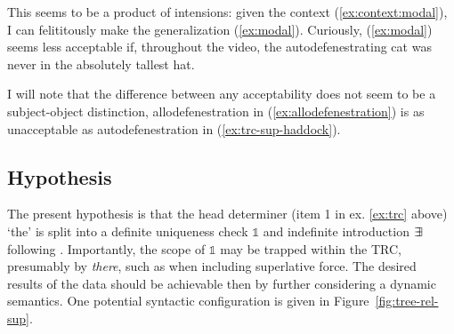 \documentclass[11pt]{article}
\DeclareMathOperator{\bbexists}{\exists\mskip-7mu\exists}
\begin{document}
This seems to be a product of intensions: given the context (\ref{ex:context:modal}), I can felititously make the generalization (\ref{ex:modal}). Curiously, (\ref{ex:modal}) seems less acceptable if, throughout the video, the autodefenestrating cat was never in the absolutely tallest hat.

\begin{exe}
\end{exe}

I will note that the difference between any acceptability does not seem to be a subject-object distinction, allodefenestration in (\ref{ex:allodefenestration}) is as unacceptable as autodefenestration in (\ref{ex:trc-sup-haddock}).

\begin{exe}
	\label{ex:allodefenestration}
\end{exe}

\subsection{Hypothesis}

The present hypothesis is that the head determiner (item 1 in ex. \ref{ex:trc} above) `the' is split into a definite uniqueness check \(\mathbb{1}\) and indefinite introduction \(\bbexists\) following \citet{bumfordSplitscopeEffectsDefinite2017}. Importantly, the scope of \(\mathbb{1}\) may be trapped within the TRC, presumably by \textit{there}, such as when including superlative force. The desired results of the data should be achievable then by further considering a dynamic semantics. One potential syntactic configuration is given in Figure~\ref{fig:tree-rel-sup}.
\end{document}

